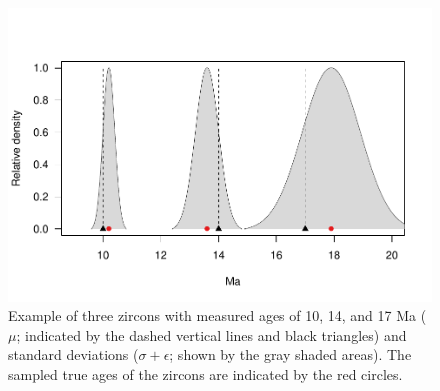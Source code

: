 \documentclass[12pt,letterpaper]{article}
\begin{document}
\begin{figure}[h!]
\centering
\includegraphics[width=120mm]{figs/ZirconAge.pdf}
\caption{Example of three zircons with measured ages of 10, 14, and 17 Ma ($\mu$; indicated by the dashed vertical lines and black triangles) and standard deviations ($\sigma + \epsilon$; shown by the gray shaded areas). The sampled true ages of the zircons are indicated by the red circles. }
\label{f_zir_age}
\end{figure}
\end{document}
